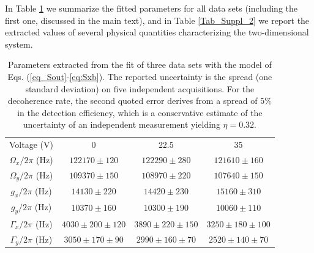 \documentclass[11pt,floatfix,amssymb,prx,aps,longbibliography,superscriptaddress,nopacs]{revtex4-2}
\newcommand{\OmegaX}{\Omega_{\scriptstyle{x}}}
\newcommand{\OmegaY}{\Omega_{\scriptstyle{y}}}
\newcommand{\GY}{\Gamma_{\scriptstyle{y}}}
\newcommand{\GX}{\Gamma_{\scriptstyle{x}}}
\newcommand{\gX}{g_{\scriptstyle{x}}}
\newcommand{\gY}{g_{\scriptstyle{y}}}
\begin{document}
In Table \ref{Tab_Suppl_1} we summarize the fitted parameters for all data sets (including the first one, discussed in the main text), and in Table \ref{Tab_Suppl_2} we report the extracted values of several physical quantities characterizing the two-dimensional system.

\begin{table}
\begin{tabular}{c||c|c|c}
Voltage  (V)  &  0 & 22.5 & 35\\
  $\OmegaX/2\pi$ (Hz)  &  $122170\pm120$ & $122290\pm280$ & $121610\pm160$ \\
   $\OmegaY/2\pi$ (Hz)   &  $109370\pm150$ & $108970\pm220$ & $107640\pm150$ \\
 $\gX/2\pi$ (Hz)    & $14130\pm220$ & $14420\pm230$ & $15160\pm310$ \\
   $\gY/2\pi$ (Hz)   &  $10370\pm160$ & $10300\pm190$ & $10060\pm 110$ \\
 $\GX/2\pi$ (Hz)    &  $4030\pm200\pm120$ & $3890\pm220\pm150$ & $3250\pm180\pm100$ \\
  $\GY/2\pi$ (Hz)    & $3050\pm170\pm90$ & $2990\pm160\pm70$ & $2520\pm140\pm70$ \\
\end{tabular}
\caption{Parameters extracted from the fit of three data sets with the model of Eqs. (\ref{eq_Sout}-\ref{eq:Sxb}). The reported uncertainty is the spread (one standard deviation) on five independent acquisitions. For the decoherence rate, the second quoted error derives from a spread of $5\%$ in the detection efficiency, which is a conservative estimate of the uncertainty of an independent measurement yielding $\eta = 0.32$.}
\label{Tab_Suppl_1}
\end{table}
\end{document}
